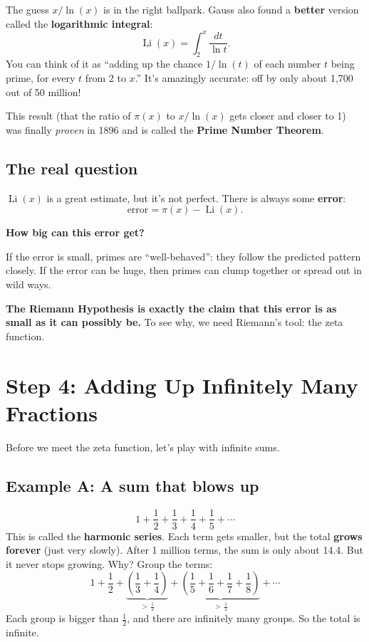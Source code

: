 \documentclass[11pt,a4paper]{article}
\newcommand{\Li}{\operatorname{Li}}
\begin{document}
The guess $x/\ln(x)$ is in the right ballpark. Gauss also found a \textbf{better} version called the \textbf{logarithmic integral}:
\[
\Li(x) = \int_2^x \frac{dt}{\ln t}.
\]
You can think of it as ``adding up the chance $1/\ln(t)$ of each number $t$ being prime, for every $t$ from 2 to $x$.'' It's amazingly accurate: off by only about 1,700 out of 50 million!

This result (that the ratio of $\pi(x)$ to $x/\ln(x)$ gets closer and closer to 1) was finally \emph{proven} in 1896 and is called the \textbf{Prime Number Theorem}.

\subsection*{The real question}

$\Li(x)$ is a great estimate, but it's not perfect. There is always some \textbf{error}:
\[
\text{error} = \pi(x) - \Li(x).
\]

\begin{keybox}
\textbf{How big can this error get?}
\end{keybox}

If the error is small, primes are ``well-behaved'': they follow the predicted pattern closely. If the error can be huge, then primes can clump together or spread out in wild ways.

\textbf{The Riemann Hypothesis is exactly the claim that this error is as small as it can possibly be.} To see why, we need Riemann's tool: the zeta function.

\section{Step 4: Adding Up Infinitely Many Fractions}

Before we meet the zeta function, let's play with infinite sums.

\subsection*{Example A: A sum that blows up}
\[
1 + \frac12 + \frac13 + \frac14 + \frac15 + \cdots
\]
This is called the \textbf{harmonic series}. Each term gets smaller, but the total \textbf{grows forever} (just very slowly). After 1 million terms, the sum is only about 14.4. But it never stops growing. Why? Group the terms:
\[
1 + \frac12 + \underbrace{\left(\frac13+\frac14\right)}_{>\,\frac12} + \underbrace{\left(\frac15+\frac16+\frac17+\frac18\right)}_{>\,\frac12} + \cdots
\]
Each group is bigger than $\frac12$, and there are infinitely many groups. So the total is infinite.
\end{document}
